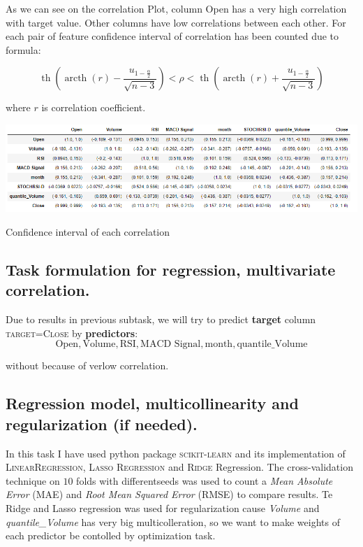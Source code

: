 \documentclass[%
12pt, %
final, %
oneside, %
onecolumn, %
centertags]{article} %
\theoremstyle{plain}
\theoremstyle{definition}
\theoremstyle{remark}
\begin{document}
As we can see on the correlation Plot, column Open has a very high correlation with target value. Other columns have low correlations between each other. For each pair of feature confidence interval of correlation has been counted due to formula:

$$\operatorname{th}\left(\operatorname{arcth}(r) - \frac{u_{1 - \frac{\alpha}{2}}}{\sqrt{n-3}}\right) < \rho < \operatorname{th}\left(\operatorname{arcth}(r) + \frac{u_{1 - \frac{\alpha}{2}}}{\sqrt{n-3}}\right)$$

where $r$ is correlation coefficient.

\begin{center}
\includegraphics[scale=0.6]{images/corr_coef.png}

Confidence interval of each correlation
\end{center}

\subsection{Task formulation for regression, multivariate correlation.}

Due to results in previous subtask, we will try to predict \textbf{target} column \textsc{target=Close} by \textbf{predictors}:
$$\text{Open}, \text{Volume}, \text{RSI}, \text{MACD Signal}, \text{month}, \text{quantile\_Volume}$$

without  because of verlow correlation.

\subsection{Regression model, multicollinearity and regularization (if needed).}

In this task I have used python package \textsc{scikit-learn} and its implementation of \textsc{LinearRegression}, \textsc{Lasso Regression} and \textsc{Ridge} Regression. The cross-validation technique on $10$ folds with differentseeds was used to count a \textit{Mean Absolute Error} (MAE) and \textit{Root Mean Squared Error} (RMSE) to compare results. Te Ridge and Lasso regression was used for regularization cause \textit{Volume} and \textit{quantile\_Volume} has very big multicolleration, so we want to make weights of each predictor be contolled by optimization task. 
\end{document}
